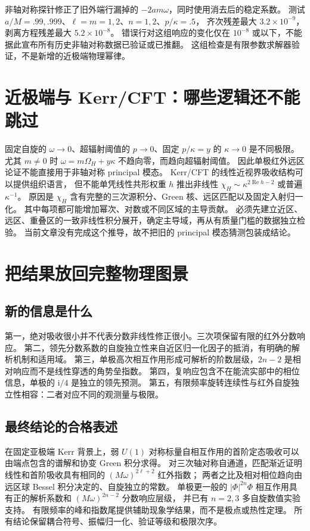 \documentclass[UTF8,fontset=fandol,11pt,a4paper]{ctexart}
\newcommand{\ii}{\mathrm{i}}
\newcommand{\Rea}{\operatorname{Re}}
\numberwithin{equation}{section}
\begin{document}
非轴对称探针修正了旧外端行漏掉的 $-2am\omega$，同时使用消去后的稳定系数。
测试 $a/M=.99,.999$、$\ell=m=1,2$、$n=1,2$、$p/\kappa=.5$，
齐次残差最大 $3.2\times10^{-9}$，剥离方程残差最大 $5.2\times10^{-8}$。
错误行对这组响应的变化仅在 $10^{-8}$ 或以下，不能据此宣布所有历史非轴对称数据已验证或已推翻。
这组检查是有限参数求解器验证，不是新增的近极端物理幂律。

\section{近极端与 Kerr/CFT：哪些逻辑还不能跳过}
固定自旋的 $\omega\to0$、超辐射阈值的 $p\to0$、固定 $p/\kappa=y$ 的 $\kappa\to0$ 是不同极限。
尤其 $m\ne0$ 时 $\omega=m\Omega_H+y\kappa$ 不趋向零，而趋向超辐射阈值。
因此单极红外远区论证不能直接用于非轴对称 principal 模态。
Kerr/CFT 的线性近视界吸收结构\cite{BredbergKerrCFT2010}可以提供组织语言，
但不能单凭线性共形权重 $h$ 推出非线性 $\chi_H\sim\kappa^{2\Rea h-2}$ 或普遍 $\kappa^{-1}$。
原因是 $\chi_H$ 含有完整的三次源积分、Green 核、远区匹配以及固定入射归一化。
其中每项都可能增加幂次、对数或不同区域的主导贡献。
必须先建立近区、远区、重叠区的一致非线性积分展开，确定主导域，再从有质量门槛的数据独立检验。
当前文章没有完成这个推导，故不把旧的 principal 模态猜测包装成结论。

\section{把结果放回完整物理图景}
\subsection{新的信息是什么}
第一，绝对吸收很小并不代表分数非线性修正很小。三次项保留有限的红外分数响应。
第二，领先分数系数的自旋独立性来自近区归一化因子的抵消，有明确的解析机制和适用域。
第三，单极高次相互作用形成可解析的阶数层级，$2n-2$ 是相对响应而不是线性穿透的角势垒指数。
第四，复响应包含不在能流实部中的相位信息，单极的 $\ii/4$ 是独立的领先预测。
第五，有限频率旋转连续性与红外自旋独立性相容：二者对应不同的观测量与极限。

\subsection{最终结论的合格表述}
在固定亚极端 Kerr 背景上，弱 $U(1)$ 对称标量自相互作用的首阶定态吸收可以由端点包含的谱解和协变 Green 积分求得。
对三次轴对称自通道，匹配渐近证明线性和首阶吸收具有相同的 $(M\omega)^{2\ell+2}$ 红外指数；
两者之比及相对相位趋向由远区球 Bessel 积分决定的、自旋独立的常数。
单极更一般的 $|\Phi|^{2n}\Phi$ 相互作用具有正的解析系数和 $(M\omega)^{2n-2}$ 分数响应层级，
并已有 $n=2,3$ 多自旋数值实验支持。
有限频率的峰和指数尾提供辅助现象学结果，而不是极点或热性定理。
所有结论保留耦合符号、振幅归一化、验证等级和极限次序。
\end{document}
